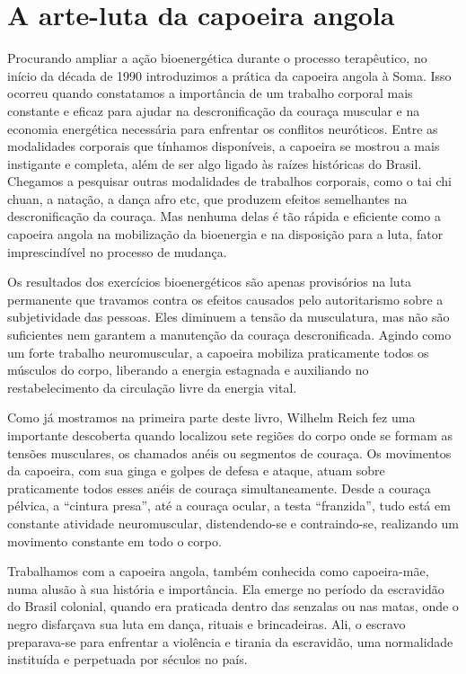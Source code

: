 \section{A arte-luta da capoeira angola}

Procurando ampliar a ação bioenergética durante o processo terapêutico,
no início da década de 1990 introduzimos a prática da capoeira angola à
Soma. Isso ocorreu quando constatamos a importância de um trabalho
corporal mais constante e eficaz para ajudar na descronificação da
couraça muscular e na economia energética necessária para enfrentar os
conflitos neuróticos. Entre as modalidades corporais que tínhamos
disponíveis, a capoeira se mostrou a mais instigante e completa, além de
ser algo ligado às raízes históricas do Brasil. Chegamos a pesquisar
outras modalidades de trabalhos corporais, como o tai chi chuan, a
natação, a dança afro etc, que produzem efeitos semelhantes na
descronificação da couraça. Mas nenhuma delas é tão rápida e eficiente
como a capoeira angola na mobilização da bioenergia e na disposição para
a luta, fator imprescindível no processo de mudança.

Os resultados dos exercícios bioenergéticos são apenas provisórios na
luta permanente que travamos contra os efeitos causados pelo
autoritarismo sobre a subjetividade das pessoas. Eles diminuem a tensão
da musculatura, mas não são suficientes nem garantem a manutenção da
couraça descronificada. Agindo como um forte trabalho neuromuscular, a
capoeira mobiliza praticamente todos os músculos do corpo, liberando a
energia estagnada e auxiliando no restabelecimento da circulação livre
da energia vital.

Como já mostramos na primeira parte deste livro, Wilhelm Reich fez uma
importante descoberta quando localizou sete regiões do corpo onde se
formam as tensões musculares, os chamados anéis ou segmentos de couraça.
Os movimentos da capoeira, com sua ginga e golpes de defesa e ataque,
atuam sobre praticamente todos esses anéis de couraça simultaneamente.
Desde a couraça pélvica, a ``cintura presa'', até a couraça ocular, a
testa ``franzida'', tudo está em constante atividade neuromuscular,
distendendo-se e contraindo-se, realizando um movimento constante em
todo o corpo.

Trabalhamos com a capoeira angola, também conhecida como capoeira-mãe,
numa alusão à sua história e importância. Ela emerge no período da
escravidão do Brasil colonial, quando era praticada dentro das senzalas
ou nas matas, onde o negro disfarçava sua luta em dança, rituais e
brincadeiras. Ali, o escravo preparava-se para enfrentar a violência e
tirania da escravidão, uma normalidade instituída e perpetuada por
séculos no país.

